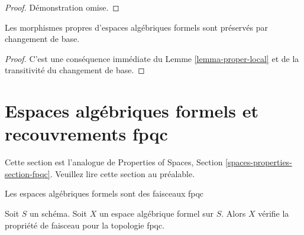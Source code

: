 \begin{proof}
Démonstration omise.
\end{proof}

\begin{lemma}
\label{lemma-base-change-proper}
Les morphismes propres d'espaces algébriques formels sont préservés par changement de base.
\end{lemma}

\begin{proof}
C'est une conséquence immédiate du Lemme \ref{lemma-proper-local}
et de la transitivité du changement de base.
\end{proof}







\section{Espaces algébriques formels et recouvrements fpqc}
\label{section-fpqc}

\noindent
Cette section est l'analogue de Properties of Spaces, Section
\ref{spaces-properties-section-fpqc}. Veuillez lire cette section
au préalable.

\begin{lemma}
\label{lemma-sheaf-fpqc}
\begin{slogan}
Les espaces algébriques formels sont des faisceaux fpqc
\end{slogan}
Soit $S$ un schéma. Soit $X$ un espace algébrique formel sur $S$. Alors
$X$ vérifie la propriété de faisceau pour la topologie fpqc.
\end{lemma}

